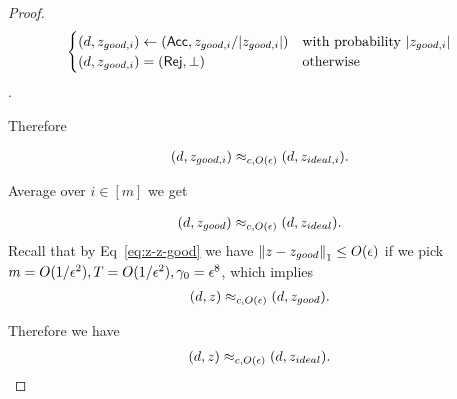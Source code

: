 \begin{proof}
$$\begin{cases}
					 (d,z_{good,i}) \leftarrow (\mathsf{Acc}, z_{good,i}/|z_{good,i}|) & \text{with probability } |z_{good,i}|\\
					(d,z_{good,i}) = (\mathsf{Rej},\bot)  & \text{otherwise } 
				\end{cases}$$.




Therefore

\begin{align}
    (d,z_{good,i})\approx_{c, O(\epsilon)}(d,z_{ideal,i}).
\end{align}

Average over $i\in[m]$ we get

\begin{align}
    (d,z_{good})\approx_{c, O(\epsilon)}(d,z_{ideal}).
\end{align}
Recall that by Eq~\ref{eq:z-z-good} we have $\left\lVert z-z_{good}\right\rVert_1 \leq O(\epsilon)$ if we pick $m=O(1/\epsilon^2), T=O(1/\epsilon^2),\gamma_0=\epsilon^8$, which implies 
\begin{align}
    (d,z)\approx_{c, O(\epsilon)}(d,z_{good}).
\end{align}

Therefore  we have  
\begin{align}
     (d,z)\approx_{c, O(\epsilon)}(d,z_{ideal}).
\end{align}

 
\end{proof}





